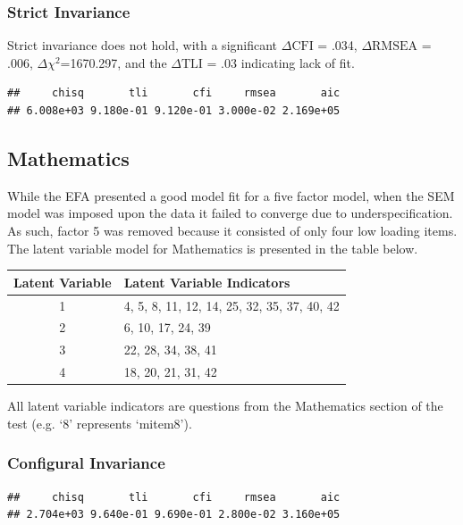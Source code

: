 \documentclass{article}\usepackage[]{graphicx}\usepackage[]{color}
\makeatletter
\newenvironment{kframe}{%
 \def\at@end@of@kframe{}%
 \ifinner\ifhmode%
  \def\at@end@of@kframe{\end{minipage}}%
  \begin{minipage}{\columnwidth}%
 \fi\fi%
 \def\FrameCommand##1{\hskip\@totalleftmargin \hskip-\fboxsep
 \colorbox{shadecolor}{##1}\hskip-\fboxsep
     \hskip-\linewidth \hskip-\@totalleftmargin \hskip\columnwidth}%
 \MakeFramed {\advance\hsize-\width
   \@totalleftmargin\z@ \linewidth\hsize
   \@setminipage}}%
 {\par\unskip\endMakeFramed%
 \at@end@of@kframe}
\newenvironment{knitrout}{}{} %
\makeatother
\begin{document}
\subsubsection{Strict Invariance}
Strict invariance does not hold, with a significant $\Delta\mathrm{CFI}$ = .034, $\Delta\mathrm{RMSEA}$ = .006, $\Delta$$\chi^2$=1670.297, and the $\Delta\mathrm{TLI}$ = .03 indicating lack of fit.

\begin{knitrout}
\color{fgcolor}\begin{kframe}
\begin{verbatim}
##     chisq       tli       cfi     rmsea       aic 
## 6.008e+03 9.180e-01 9.120e-01 3.000e-02 2.169e+05
\end{verbatim}
\end{kframe}
\end{knitrout}

\subsection{Mathematics}
While the EFA presented a good model fit for a five factor model, when the SEM model was imposed upon the data it failed to converge due to underspecification. As such, factor 5 was removed because it consisted of only four low loading items. The latent variable model for Mathematics is presented in the table below. 

\vspace{0.25cm}

\begin{minipage}{\linewidth}
\begin{tabular}{|c|l|}
\multicolumn{1}{c}{Latent Variable} & \multicolumn{1}{l}{Latent Variable Indicators}\tabularnewline
\hline 
1 & 4, 5, 8, 11, 12, 14, 25, 32, 35, 37, 40, 42\tabularnewline
\hline 
2 & 6, 10, 17, 24, 39\tabularnewline
\hline 
3 & 22, 28, 34, 38, 41\tabularnewline
\hline 
4 & 18, 20, 21, 31, 42\tabularnewline
\hline 
\end{tabular}

\bigskip

All latent variable indicators are questions from the Mathematics section of the test (e.g. `8' represents `mitem8').

\end{minipage}


\subsubsection{Configural Invariance}
\begin{knitrout}
\color{fgcolor}\begin{kframe}
\begin{verbatim}
##     chisq       tli       cfi     rmsea       aic 
## 2.704e+03 9.640e-01 9.690e-01 2.800e-02 3.160e+05
\end{verbatim}
\end{kframe}
\end{knitrout}
\end{document}
